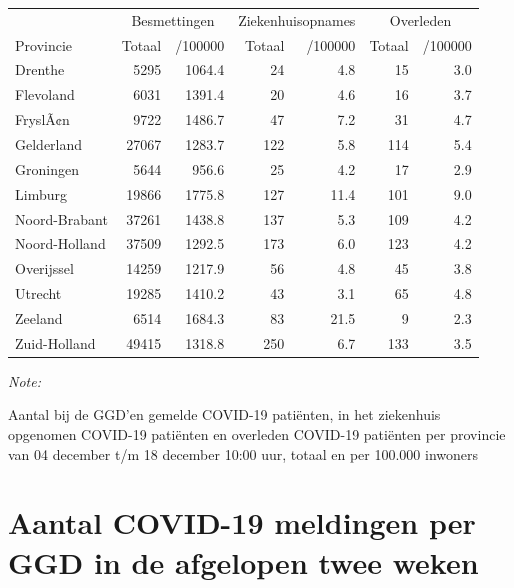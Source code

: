 \documentclass[
  english,
  man,floatsintext]{apa6}
\begin{document}
\begin{table}
\centering
\begin{threeparttable}
\begin{tabular}{lrrrrrr}
\toprule
\multicolumn{1}{c}{ } & \multicolumn{2}{c}{Besmettingen} & \multicolumn{2}{c}{Ziekenhuisopnames} & \multicolumn{2}{c}{Overleden} \\
\cmidrule(l{3pt}r{3pt}){2-3} \cmidrule(l{3pt}r{3pt}){4-5} \cmidrule(l{3pt}r{3pt}){6-7}
Provincie & Totaal & /100000 & Totaal & /100000 & Totaal & /100000\\
\midrule
Drenthe & 5295 & 1064.4 & 24 & 4.8 & 15 & 3.0\\
Flevoland & 6031 & 1391.4 & 20 & 4.6 & 16 & 3.7\\
FryslÃ¢n & 9722 & 1486.7 & 47 & 7.2 & 31 & 4.7\\
Gelderland & 27067 & 1283.7 & 122 & 5.8 & 114 & 5.4\\
Groningen & 5644 & 956.6 & 25 & 4.2 & 17 & 2.9\\
Limburg & 19866 & 1775.8 & 127 & 11.4 & 101 & 9.0\\
Noord-Brabant & 37261 & 1438.8 & 137 & 5.3 & 109 & 4.2\\
Noord-Holland & 37509 & 1292.5 & 173 & 6.0 & 123 & 4.2\\
Overijssel & 14259 & 1217.9 & 56 & 4.8 & 45 & 3.8\\
Utrecht & 19285 & 1410.2 & 43 & 3.1 & 65 & 4.8\\
Zeeland & 6514 & 1684.3 & 83 & 21.5 & 9 & 2.3\\
Zuid-Holland & 49415 & 1318.8 & 250 & 6.7 & 133 & 3.5\\
\bottomrule
\end{tabular}
\begin{tablenotes}
\item \textit{Note: } 
\item Aantal bij de GGD’en gemelde COVID-19 patiënten, in het ziekenhuis opgenomen COVID-19 patiënten en overleden COVID-19 patiënten per provincie van 04 december t/m 18 december 10:00 uur, totaal en per 100.000 inwoners
\end{tablenotes}
\end{threeparttable}
\end{table}

\newpage

\hypertarget{aantal-covid-19-meldingen-per-ggd-in-de-afgelopen-twee-weken}{%
\section{Aantal COVID-19 meldingen per GGD in de afgelopen twee weken}\label{aantal-covid-19-meldingen-per-ggd-in-de-afgelopen-twee-weken}}
\end{document}
